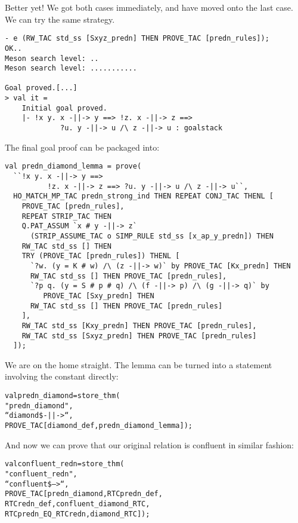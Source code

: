 Better yet! We got both cases immediately, and have moved onto the
last case.  We can try the same strategy.
\begin{session}\begin{verbatim}
- e (RW_TAC std_ss [Sxyz_predn] THEN PROVE_TAC [predn_rules]);
OK..
Meson search level: ..
Meson search level: ...........

Goal proved.[...]
> val it =
    Initial goal proved.
    |- !x y. x -||-> y ==> !z. x -||-> z ==>
             ?u. y -||-> u /\ z -||-> u : goalstack
\end{verbatim}\end{session}
The final goal proof can be packaged into:
\begin{session}\begin{verbatim}
val predn_diamond_lemma = prove(
  ``!x y. x -||-> y ==>
          !z. x -||-> z ==> ?u. y -||-> u /\ z -||-> u``,
  HO_MATCH_MP_TAC predn_strong_ind THEN REPEAT CONJ_TAC THENL [
    PROVE_TAC [predn_rules],
    REPEAT STRIP_TAC THEN
    Q.PAT_ASSUM `x # y -||-> z`
      (STRIP_ASSUME_TAC o SIMP_RULE std_ss [x_ap_y_predn]) THEN
    RW_TAC std_ss [] THEN
    TRY (PROVE_TAC [predn_rules]) THENL [
      `?w. (y = K # w) /\ (z -||-> w)` by PROVE_TAC [Kx_predn] THEN
      RW_TAC std_ss [] THEN PROVE_TAC [predn_rules],
      `?p q. (y = S # p # q) /\ (f -||-> p) /\ (g -||-> q)` by
         PROVE_TAC [Sxy_predn] THEN
      RW_TAC std_ss [] THEN PROVE_TAC [predn_rules]
    ],
    RW_TAC std_ss [Kxy_predn] THEN PROVE_TAC [predn_rules],
    RW_TAC std_ss [Sxyz_predn] THEN PROVE_TAC [predn_rules]
  ]);
\end{verbatim}\end{session}
\eos{}

We are on the home straight.  The lemma can be turned into a statement
involving the  constant directly:
\begin{session}\begin{alltt}
val predn_diamond = store_thm(
  "predn_diamond",
  ``diamond \$-||->``,
  PROVE_TAC [diamond_def, predn_diamond_lemma]);
\end{alltt}\end{session}

And now we can prove that our original relation is confluent in
similar fashion:

\begin{session}\begin{alltt}
val confluent_redn = store_thm(
  "confluent_redn",
  ``confluent \$-->``,
  PROVE_TAC [predn_diamond, RTCpredn_def,
             RTCredn_def, confluent_diamond_RTC,
             RTCpredn_EQ_RTCredn, diamond_RTC]);
\end{alltt}\end{session}



